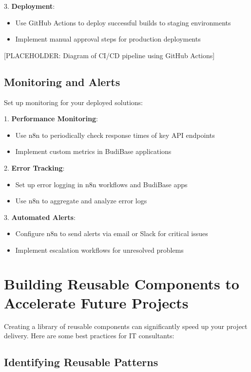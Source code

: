 3. \textbf{Deployment}:
\begin{itemize}
    \item Use GitHub Actions to deploy successful builds to staging environments
    \item Implement manual approval steps for production deployments
\end{itemize}

[PLACEHOLDER: Diagram of CI/CD pipeline using GitHub Actions]

\subsection{Monitoring and Alerts}

Set up monitoring for your deployed solutions:

1. \textbf{Performance Monitoring}:
\begin{itemize}
    \item Use n8n to periodically check response times of key API endpoints
    \item Implement custom metrics in BudiBase applications
\end{itemize}

2. \textbf{Error Tracking}:
\begin{itemize}
    \item Set up error logging in n8n workflows and BudiBase apps
    \item Use n8n to aggregate and analyze error logs
\end{itemize}

3. \textbf{Automated Alerts}:
\begin{itemize}
    \item Configure n8n to send alerts via email or Slack for critical issues
    \item Implement escalation workflows for unresolved problems
\end{itemize}

\section{Building Reusable Components to Accelerate Future Projects}

Creating a library of reusable components can significantly speed up your project delivery. Here are some best practices for IT consultants:

\subsection{Identifying Reusable Patterns}

